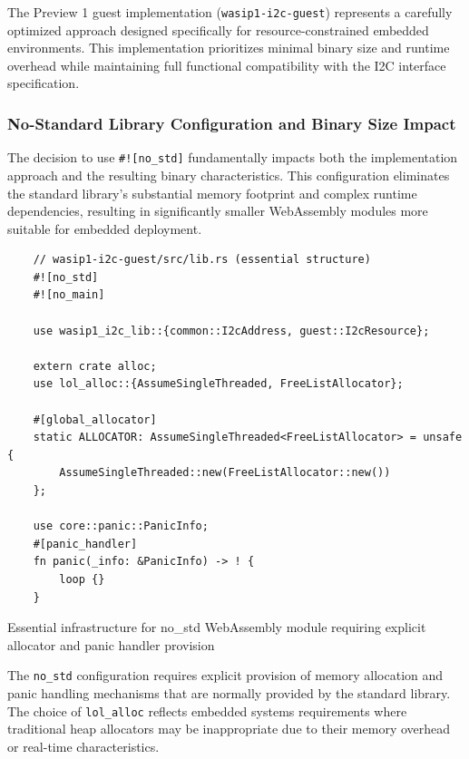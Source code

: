The Preview 1 guest implementation (\texttt{wasip1-i2c-guest}) represents a carefully optimized approach designed specifically for resource-constrained embedded environments. This implementation prioritizes minimal binary size and runtime overhead while maintaining full functional compatibility with the I2C interface specification.

\subsubsection{No-Standard Library Configuration and Binary Size Impact}

The decision to use \texttt{\#![no\_std]} fundamentally impacts both the implementation approach and the resulting binary characteristics. This configuration eliminates the standard library's substantial memory footprint and complex runtime dependencies, resulting in significantly smaller WebAssembly modules more suitable for embedded deployment.

\begin{listing}[H]
    \begin{verbatim}
    // wasip1-i2c-guest/src/lib.rs (essential structure)
    #![no_std]
    #![no_main]
    
    use wasip1_i2c_lib::{common::I2cAddress, guest::I2cResource};
    
    extern crate alloc;
    use lol_alloc::{AssumeSingleThreaded, FreeListAllocator};
    
    #[global_allocator]
    static ALLOCATOR: AssumeSingleThreaded<FreeListAllocator> = unsafe {
        AssumeSingleThreaded::new(FreeListAllocator::new())
    };
    
    use core::panic::PanicInfo;
    #[panic_handler]
    fn panic(_info: &PanicInfo) -> ! {
        loop {}
    }
    \end{verbatim}
    \caption{Essential infrastructure for no\_std WebAssembly module requiring explicit allocator and panic handler provision}
    \label{lst:no-std-infrastructure}
\end{listing}

The \texttt{no\_std} configuration requires explicit provision of memory allocation and panic handling mechanisms that are normally provided by the standard library. The choice of \texttt{lol\_alloc} reflects embedded systems requirements where traditional heap allocators may be inappropriate due to their memory overhead or real-time characteristics.

